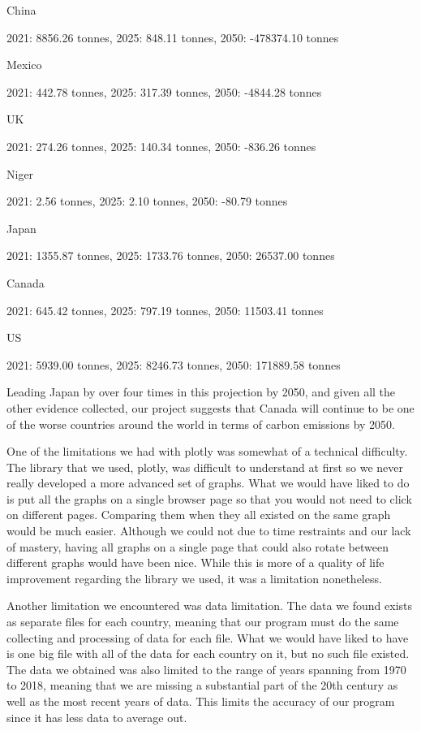 \documentclass[fontsize=11pt]{article}
\begin{document}
    China

    2021: 8856.26 tonnes, 2025: 848.11 tonnes, 2050: -478374.10 tonnes


    Mexico

    2021: 442.78 tonnes, 2025: 317.39 tonnes, 2050: -4844.28 tonnes

    UK

    2021: 274.26 tonnes, 2025: 140.34 tonnes, 2050: -836.26 tonnes


    Niger

    2021: 2.56 tonnes, 2025: 2.10 tonnes, 2050: -80.79 tonnes

    Japan

    2021: 1355.87 tonnes, 2025: 1733.76 tonnes, 2050: 26537.00 tonnes

    Canada

    2021: 645.42 tonnes, 2025: 797.19 tonnes, 2050: 11503.41 tonnes

    US

    2021: 5939.00 tonnes, 2025: 8246.73 tonnes, 2050: 171889.58 tonnes

    Leading Japan by over four times in this projection by 2050, and given all the other evidence collected, our project suggests that Canada will continue to be one of the worse countries around the world in terms of carbon emissions by 2050.

    One of the limitations we had with plotly was somewhat of a technical difficulty. The library that we used, plotly, was difficult to understand at first so we never really developed a more advanced set of graphs. What we would have liked to do is put all the graphs on a single browser page so that you would not need to click on different pages. Comparing them when they all existed on the same graph would be much easier. Although we could not due to time restraints and our lack of mastery, having all graphs on a single page that could also rotate between different graphs would have been nice. While this is more of a quality of life improvement regarding the library we used, it was a limitation nonetheless.

    Another limitation we encountered was data limitation. The data we found exists as separate files for each country, meaning that our program must do the same collecting and processing of data for each file. What we would have liked to have is one big file with all of the data for each country on it, but no such file existed. The data we obtained was also limited to the range of years spanning from 1970 to 2018, meaning that we are missing a substantial part of the 20th century as well as the most recent years of data. This limits the accuracy of our program since it has less data to average out.
\end{document}

